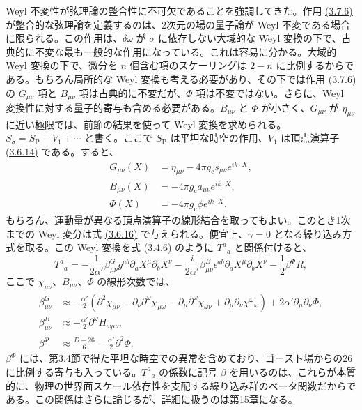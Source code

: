 Weyl 不変性が弦理論の整合性に不可欠であることを強調してきた。作用 \hyperref[eq:3.7.6]{(3.7.6)} が整合的な弦理論を定義するのは、2次元の場の量子論が Weyl 不変である場合に限られる。この作用は、$\delta\omega$ が $\sigma$ に依存しない大域的な Weyl 変換の下で、古典的に不変な最も一般的な作用になっている。これは容易に分かる。大域的 Weyl 変換の下で、微分を $n$ 個含む項のスケーリングは $2-n$ に比例するからである。もちろん局所的な Weyl 変換も考える必要があり、その下では作用 \hyperref[eq:3.7.6]{(3.7.6)} の $G_{\mu\nu}$ 項と $B_{\mu\nu}$ 項は古典的に不変だが、$\Phi$ 項は不変ではない。さらに、Weyl 変換性に対する量子的寄与も含める必要がある。$B_{\mu\nu}$ と $\Phi$ が小さく、$G_{\mu\nu}$ が $\eta_{\mu\nu}$ に近い極限では、前節の結果を使って Weyl 変換を求められる。$S_\sigma=S_{\mathrm P}-V_1+\cdots$ と書く。ここで $S_{\mathrm P}$ は平坦な時空の作用、$V_1$ は頂点演算子 \hyperref[eq:3.6.14]{(3.6.14)} である。すると、
\begin{align}
G_{\mu\nu}(X)&=\eta_{\mu\nu}-4\pi g_{\mathrm c}s_{\mu\nu}e^{ik\cdot X},
\tag{3.7.11a}\label{eq:3.7.11a}\\
B_{\mu\nu}(X)&=-4\pi g_{\mathrm c}a_{\mu\nu}e^{ik\cdot X},
\tag{3.7.11b}\label{eq:3.7.11b}\\
\Phi(X)&=-4\pi g_{\mathrm c}\phi e^{ik\cdot X}.
\tag{3.7.11c}\label{eq:3.7.11c}
\end{align}
もちろん、運動量が異なる頂点演算子の線形結合を取ってもよい。このとき1次までの Weyl 変分は式 \hyperref[eq:3.6.16]{(3.6.16)} で与えられる。便宜上、$\gamma=0$ となる繰り込み方式を取る。この Weyl 変換を式 \hyperref[eq:3.4.6]{(3.4.6)} のように $T^a{}_a$ と関係付けると、
\begin{equation}
T^a{}_a=
-\frac1{2\alpha'}\beta^G_{\mu\nu}g^{ab}\partial_aX^\mu\partial_bX^\nu
-\frac{i}{2\alpha'}\beta^B_{\mu\nu}\epsilon^{ab}\partial_aX^\mu\partial_bX^\nu
-\frac12\beta^\Phi R,
\tag{3.7.12}\label{eq:3.7.12}
\end{equation}
ここで $\chi_{\mu\nu}$、$B_{\mu\nu}$、$\Phi$ の線形次数では、
\begin{align}
\beta^G_{\mu\nu}
&\approx-\frac{\alpha'}2
\left(\partial^2\chi_{\mu\nu}
-\partial_\nu\partial^\omega\chi_{\mu\omega}
-\partial_\mu\partial^\omega\chi_{\omega\nu}
+\partial_\mu\partial_\nu\chi^\omega{}_\omega\right)
+2\alpha'\partial_\mu\partial_\nu\Phi,
\tag{3.7.13a}\label{eq:3.7.13a}\\
\beta^B_{\mu\nu}&\approx-\frac{\alpha'}2\partial^\omega H_{\omega\mu\nu},
\tag{3.7.13b}\label{eq:3.7.13b}\\
\beta^\Phi&\approx\frac{D-26}{6}-\frac{\alpha'}2\partial^2\Phi.
\tag{3.7.13c}\label{eq:3.7.13c}
\end{align}
$\beta^\Phi$ には、第3.4節で得た平坦な時空での異常を含めており、ゴースト場からの26に比例する寄与も入っている。$T^a{}_a$ の係数に記号 $\beta$ を用いるのは、これらが本質的に、物理の世界面スケール依存性を支配する繰り込み群のベータ関数だからである。この関係はさらに論じるが、詳細に扱うのは第15章になる。

